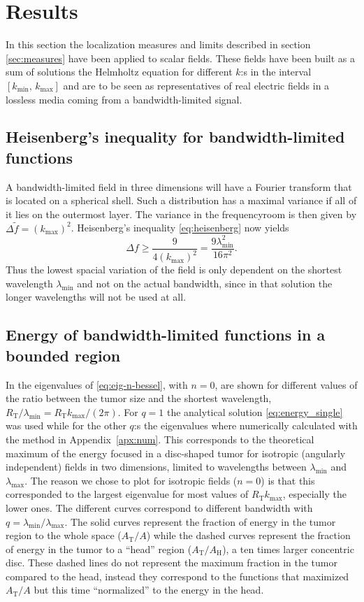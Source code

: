 \documentclass[11pt,a4paper, 
swedish,english %
]{article}
\newcommand{\RT}{\ensuremath{R_{\text{T}}}}
\newcommand{\tf}{\ensuremath{\tilde{f}}}
\begin{document}
\section{Results}
In this section the localization measures and limits described in 
section \ref{sec:measures} have been applied to scalar fields. These 
fields have been built as a sum of solutions the Helmholtz equation for 
different $k$:s in the interval $[k_{\min},\,k_{\max}]$ and are to be 
seen as representatives of real electric fields in a lossless media 
coming from a bandwidth-limited signal.


\subsection{Heisenberg's inequality for bandwidth-limited functions}
A bandwidth-limited field in three dimensions will have a Fourier transform that is located on a spherical
shell. Such a distribution has a maximal variance if all of it lies on the outermost layer. The variance
in the frequencyroom is then given by $\Delta \tf=(k_{\max})^2$. Heisenberg's inequality \eqref{eq:heisenberg}
now yields
\begin{equation}
\Delta f \geq \frac{9}{4(k_{\max})^2}=\frac{9\lambda_{\min}^2}{16\pi^2}.
\end{equation}
Thus the lowest spacial variation of the field is only dependent on the shortest wavelength $\lambda_{\min}$
and not on the actual bandwidth, since in that solution the longer wavelengths will not be used at all.

\subsection{Energy of bandwidth-limited functions in a bounded region}

In  the eigenvalues of \eqref{eq:eig-n-bessel}, with $n=0$, are shown 
for different values of the ratio between the tumor size and the
shortest wavelength, $\RT/\lambda_{\min}=\RT{k_{\max}}/(2\pi)$. For
$q=1$ the analytical solution \eqref{eq:energy_single} was used while
for the other $q$:s the eigenvalues where numerically calculated with
the method in Appendix~\ref{apx:num}. 
This corresponds to the theoretical maximum of the energy focused in a
disc-shaped tumor for isotropic (angularly independent) fields in two
dimensions, limited to wavelengths between $\lambda_{\min}$ and
$\lambda_{\max}$. 
The reason we chose to plot for isotropic fields ($n=0$) is that this
corresponded to the largest eigenvalue for most values of $\RT
k_{\max}$, especially the lower ones. 
The different curves correspond to different bandwidth with
$q=\lambda_{\min}/\lambda_{\max}$. The solid curves represent the
fraction of energy in the tumor region to the whole space
($A_\text{T}/A$) while the dashed curves represent the fraction of
energy in the tumor to a ``head'' region ($A_\text{T}/A_\text{H}$), a
ten times larger concentric disc. These dashed lines do not represent
the maximum fraction in the tumor compared to the head, instead they
correspond to the functions that maximized $A_\text{T}/A$ but this
time ``normalized''  to the energy in the head. 
\end{document}

